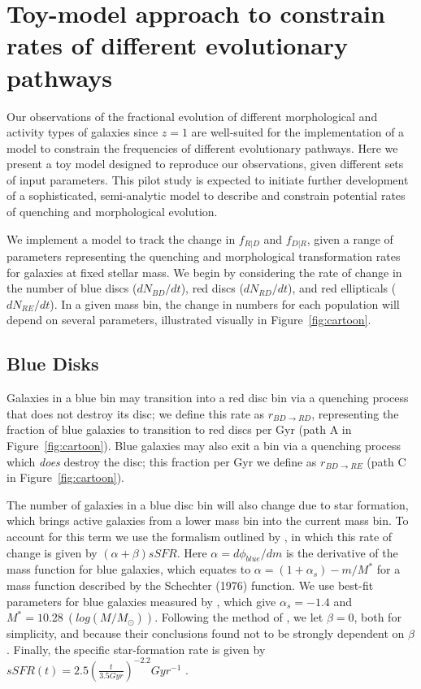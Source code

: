 \documentclass[useAMS,usenatbib]{mn2e}
\begin{document}

  


\newpage
\clearpage

\appendix

\section{Toy-model approach to constrain rates of different evolutionary pathways}
\label{appx:toymodel}

Our observations of the fractional evolution of different morphological and activity types of galaxies since $z=1$ are well-suited for the implementation of a model to constrain the frequencies of different evolutionary pathways. Here we present a toy model designed to reproduce our observations, given different sets of input parameters. This pilot study is expected to initiate further development of a sophisticated, semi-analytic model to describe and constrain potential rates of quenching and morphological evolution. 

We implement a model to track the change in $f_{R|D}$ and $f_{D|R}$, given a range of parameters representing the quenching and morphological transformation rates for galaxies at fixed stellar mass. We begin by considering the rate of change in the number of blue discs ($dN_{BD}/dt$), red discs ($dN_{RD}/dt$), and red ellipticals ($dN_{RE}/dt$). In a given mass bin, the change in numbers for each population will depend on several parameters, illustrated visually in Figure~\ref{fig:cartoon}.

\subsection{Blue Disks}

Galaxies in a blue bin may transition into a red disc bin via a quenching process that does not destroy its disc; we define this rate as $r_{BD \rightarrow RD}$, representing the fraction of blue galaxies to transition to red discs per Gyr (path A in Figure~\ref{fig:cartoon}). Blue galaxies may also exit a bin via a quenching process which \emph{does} destroy the disc; this fraction per Gyr we define as $r_{BD \rightarrow RE}$ (path C in Figure~\ref{fig:cartoon}).

The number of galaxies in a blue disc bin will also change due to star formation, which brings active galaxies from a lower mass bin into the current mass bin. To account for this term we use the formalism outlined by \citet{Peng2010}, in which this rate of change is given by $(\alpha + \beta)sSFR$. Here $\alpha = d\phi_{blue}/dm$ is the derivative of the mass function for blue galaxies, which equates to $\alpha = (1+\alpha_s) - m/M^*$ for a mass function described by the Schechter (1976) function. We use best-fit parameters for blue galaxies measured by \citet{Ichikawa2017}, which give $\alpha_s = -1.4$ and $M^* = 10.28 ~(log(M/M_{\odot}))$. Following the method of \citet{Peng2010}, we let $\beta=0$, both for simplicity, and because their conclusions found not to be strongly dependent on $\beta$. Finally, the specific star-formation rate is given by $sSFR(t) = 2.5(\frac{t}{3.5 Gyr})^{-2.2}Gyr^{-1}$ \citep{Peng2010}.
\end{document}
